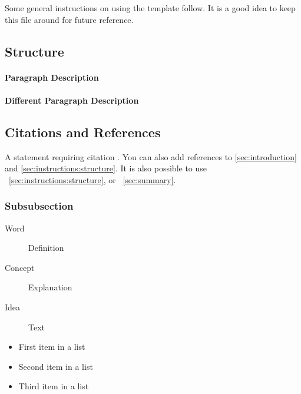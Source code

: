 Some general instructions on using the template follow.
It is a good idea to keep this file around for future reference.


\subsection{Structure}
\label{sec:instructions:structure}
\lipsum[5] %

\paragraph{Paragraph Description} \lipsum[7] %

\paragraph{Different Paragraph Description} \lipsum[8] %


\subsection{Citations and References}
\label{sec:instructions:references}
A statement requiring citation \cite{Figueredo:2009dg}.
You can also add references to \autoref{sec:introduction} and \autoref{sec:instructions:structure}.
It is also possible to use \sectionautorefname~\vref{sec:instructions:structure},
or \sectionautorefname~\vref{sec:summary}.


\subsubsection{Subsubsection}

\lipsum[12] %

\begin{description}
\item[Word] Definition
\item[Concept] Explanation
\item[Idea] Text
\end{description}

\lipsum[12] %

\begin{itemize}[noitemsep] %
\item First item in a list
\item Second item in a list
\item Third item in a list
\end{itemize}

